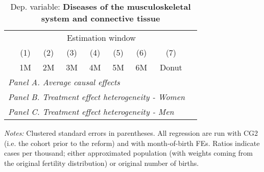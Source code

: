  \begin{table}[H] \begin{threeparttable} \centering \caption{Dep. variable: \textbf{Diseases of the musculoskeletal system and connective tissue}} {\def\sym#1{\ifmmode^{#1}\else\(^{#1}\)\fi} \begin{tabular}{l*{8}{c}} \toprule & \multicolumn{7}{c}{Estimation window} \\ \cmidrule(lr){2-8}
            &\multicolumn{1}{c}{(1)}&\multicolumn{1}{c}{(2)}&\multicolumn{1}{c}{(3)}&\multicolumn{1}{c}{(4)}&\multicolumn{1}{c}{(5)}&\multicolumn{1}{c}{(6)}&\multicolumn{1}{c}{(7)}\\
            &\multicolumn{1}{c}{1M}&\multicolumn{1}{c}{2M}&\multicolumn{1}{c}{3M}&\multicolumn{1}{c}{4M}&\multicolumn{1}{c}{5M}&\multicolumn{1}{c}{6M}&\multicolumn{1}{c}{Donut}\\
\midrule
 \multicolumn{8}{l}{\emph{Panel A. Average causal effects}} \\       \midrule\multicolumn{8}{l}{\emph{Panel B. Treatment effect heterogeneity - Women}} \\       \midrule\multicolumn{8}{l}{\emph{Panel C. Treatment effect heterogeneity - Men}} \\       
\bottomrule \end{tabular} } \begin{tablenotes} \item \scriptsize \emph{Notes:} Clustered standard errors in parentheses. All regression are run with CG2 (i.e. the cohort prior to the reform) and with month-of-birth FEs. Ratios indicate cases per thousand; either approximated population (with weights coming from the original fertility distribution) or original number of births. \end{tablenotes} \end{threeparttable} \end{table} 
